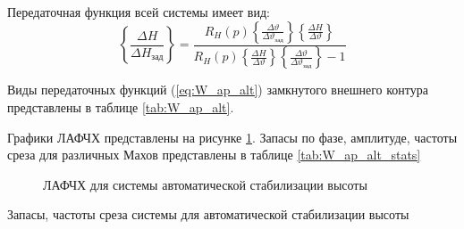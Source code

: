 Передаточная функция всей системы имеет вид: 
\begin{equation}
    \left\{ \frac{\Delta H}{\Delta H_{зад}} \right\}  = \frac{R_H(p) \left\{ \frac{\Delta \vartheta}{\Delta \vartheta_{зад}} \right\} \left\{ \frac{\Delta H }{\Delta \vartheta} \right\}}{R_H(p) \left\{ \frac{\Delta H }{\Delta \vartheta} \right\} \left\{ \frac{\Delta \vartheta}{\Delta \vartheta_{зад}} \right\}  - 1}
    \label{eq:W_ap_alt}
\end{equation}

Виды передаточных функций (\ref{eq:W_ap_alt}) замкнутого внешнего контура представлены в таблице \ref{tab:W_ap_alt}.

\begin{table}[H]
    \centering
    \caption{Передаточные функции замкнутого внешнего контура при различных скоростных напорах}
    \label{tab:W_ap_alt}
\end{table}

Графики ЛАФЧХ представлены на рисунке \ref{fig:W_ap_alt}. Запасы по фазе,
амплитуде, частоты среза для различных Махов представлены в таблице
\ref{tab:W_ap_alt_stats}

\begin{figure}[H]
    \centering
    
    \caption{ЛАФЧХ для системы автоматической стабилизации высоты}
    \label{fig:W_ap_alt}
\end{figure}
\begin{table}[H]
    \centering
    \caption{Запасы, частоты среза системы для автоматической стабилизации высоты}
    \label{tab:W_ap_alt_stats}
    
\end{table}


